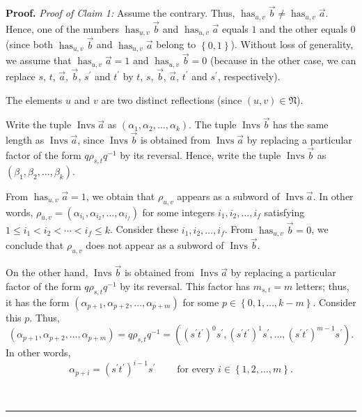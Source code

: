 \documentclass[numbers=enddot,12pt,final,onecolumn,notitlepage,abstracton]{scrartcl}%
\theoremstyle{definition}
\newenvironment{proof}[1][Proof]{\noindent\textbf{#1.} }{\ \rule{0.5em}{0.5em}}
\begin{document}
\begin{proof}
\textit{Proof of Claim 1:} Assume the contrary. Thus, $\operatorname*{has}%
\nolimits_{u,v}\overrightarrow{b}\neq\operatorname*{has}\nolimits_{u,v}%
\overrightarrow{a}$. Hence, one of the numbers $\operatorname*{has}%
\nolimits_{u,v}\overrightarrow{b}$ and $\operatorname*{has}\nolimits_{u,v}%
\overrightarrow{a}$ equals $1$ and the other equals $0$ (since both
$\operatorname*{has}\nolimits_{u,v}\overrightarrow{b}$ and
$\operatorname*{has}\nolimits_{u,v}\overrightarrow{a}$ belong to $\left\{
0,1\right\}  $). Without loss of generality, we assume that
$\operatorname*{has}\nolimits_{u,v}\overrightarrow{a}=1$ and
$\operatorname*{has}\nolimits_{u,v}\overrightarrow{b}=0$ (because in the other
case, we can replace $s$, $t$, $\overrightarrow{a}$, $\overrightarrow{b}$,
$s^{\prime}$ and $t^{\prime}$ by $t$, $s$, $\overrightarrow{b}$,
$\overrightarrow{a}$, $t^{\prime}$ and $s^{\prime}$, respectively).

The elements $u$ and $v$ are two distinct reflections (since $\left(
u,v\right)  \in\mathfrak{N}$).

Write the tuple $\operatorname*{Invs}\overrightarrow{a}$ as $\left(
\alpha_{1},\alpha_{2},\ldots,\alpha_{k}\right)  $. The tuple
$\operatorname*{Invs}\overrightarrow{b}$ has the same length as
$\operatorname*{Invs}\overrightarrow{a}$, since $\operatorname*{Invs}%
\overrightarrow{b}$ is obtained from $\operatorname*{Invs}\overrightarrow{a}$
by replacing a particular factor of the form $q\rho_{s,t}q^{-1}$ by its
reversal. Hence, write the tuple $\operatorname*{Invs}\overrightarrow{b}$ as
$\left(  \beta_{1},\beta_{2},\ldots,\beta_{k}\right)  $.

From $\operatorname*{has}\nolimits_{u,v}\overrightarrow{a}=1$, we obtain that
$\rho_{u,v}$ appears as a subword of $\operatorname*{Invs}\overrightarrow{a}$.
In other words, $\rho_{u,v}=\left(  \alpha_{i_{1}},\alpha_{i_{2}}%
,\ldots,\alpha_{i_{f}}\right)  $ for some integers $i_{1},i_{2},\ldots,i_{f}$
satisfying $1\leq i_{1}<i_{2}<\cdots<i_{f}\leq k$. Consider these $i_{1}%
,i_{2},\ldots,i_{f}$. From $\operatorname*{has}\nolimits_{u,v}%
\overrightarrow{b}=0$, we conclude that $\rho_{u,v}$ does not appear as a
subword of $\operatorname*{Invs}\overrightarrow{b}$.

On the other hand, $\operatorname*{Invs}\overrightarrow{b}$ is obtained from
$\operatorname*{Invs}\overrightarrow{a}$ by replacing a particular factor of
the form $q\rho_{s,t}q^{-1}$ by its reversal. This factor has $m_{s,t}=m$
letters; thus, it has the form $\left(  \alpha_{p+1},\alpha_{p+2}%
,\ldots,\alpha_{p+m}\right)  $ for some $p\in\left\{  0,1,\ldots,k-m\right\}
$. Consider this $p$. Thus,%
\[
\left(  \alpha_{p+1},\alpha_{p+2},\ldots,\alpha_{p+m}\right)  =q\rho
_{s,t}q^{-1}=\left(  \left(  s^{\prime}t^{\prime}\right)  ^{0}s^{\prime
},\left(  s^{\prime}t^{\prime}\right)  ^{1}s^{\prime},\ldots,\left(
s^{\prime}t^{\prime}\right)  ^{m-1}s^{\prime}\right)  .
\]
In other words,%
\begin{equation}
\alpha_{p+i}=\left(  s^{\prime}t^{\prime}\right)  ^{i-1}s^{\prime
}\ \ \ \ \ \ \ \ \ \ \text{for every }i\in\left\{  1,2,\ldots,m\right\}  .
\label{pf.thm.has.c1.2}%
\end{equation}



\end{proof}
\end{document}
